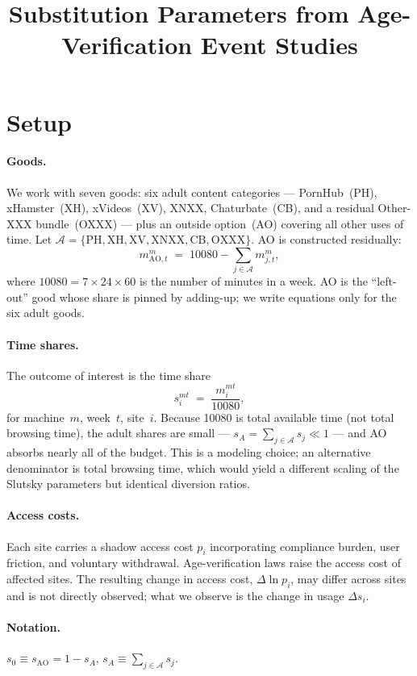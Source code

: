 \documentclass{article}
\title{Substitution Parameters from Age-Verification Event Studies}
\author{}
\date{}
\begin{document}
\maketitle

\section{Setup}

\paragraph{Goods.} We work with seven goods: six adult content categories ---
PornHub~(PH), xHamster~(XH), xVideos~(XV), XNXX, Chaturbate~(CB), and a
residual Other-XXX bundle~(OXXX) --- plus an outside option~(AO) covering all
other uses of time.  Let $\mathcal{A} = \{\mathrm{PH, XH, XV, XNXX, CB,
OXXX}\}$.  AO is constructed residually:
\[
  m_{\mathrm{AO},t}^m \;=\; 10080 - \sum_{j \in \mathcal{A}} m_{j,t}^m,
\]
where $10080 = 7 \times 24 \times 60$ is the number of minutes in a week.
AO is the ``left-out'' good whose share is pinned by adding-up; we write
equations only for the six adult goods.

\paragraph{Time shares.} The outcome of interest is the time share
\[
  s_i^{mt} \;=\; \frac{m_i^{mt}}{10080},
\]
for machine~$m$, week~$t$, site~$i$.  Because 10080 is total available time
(not total browsing time), the adult shares are small --- $s_A = \sum_{j \in
\mathcal{A}} s_j \ll 1$ --- and AO absorbs nearly all of the budget.  This is a
modeling choice; an alternative denominator is total browsing time, which would
yield a different scaling of the Slutsky parameters but identical diversion
ratios.

\paragraph{Access costs.} Each site carries a shadow access cost $p_i$
incorporating compliance burden, user friction, and voluntary withdrawal.
Age-verification laws raise the access cost of affected sites.  The resulting
change in access cost, $\Delta\ln p_i$, may differ across sites and is not
directly observed; what we observe is the change in usage $\Delta s_i$.

\paragraph{Notation.} $s_0 \equiv s_{\mathrm{AO}} = 1 - s_A$, $s_A \equiv
\sum_{j \in \mathcal{A}} s_j$.
\end{document}
